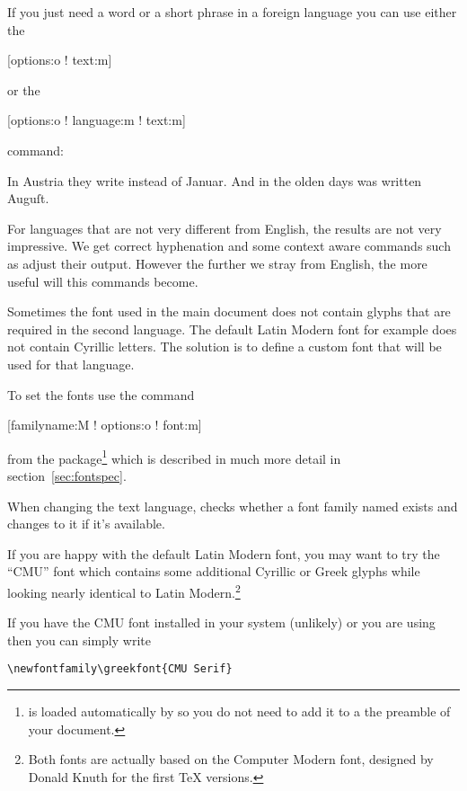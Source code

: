 If you just need a word or a short phrase in a foreign language you can use
either the
\begin{lscommand}
  [options:o ! text:m]
\end{lscommand}
or the
\begin{lscommand}
  [options:o ! language:m ! text:m]
\end{lscommand}
command:
\begin{example}[examplewidth=0.33\linewidth]
In Austria they write
instead of \textgerman{Januar}.
And in the olden days 
was written
\textgerman[script=blackletter]{Auguſt}.
\end{example}

For languages that are not very different from English, the results are not
very impressive. We get correct hyphenation and some context aware commands
such as  adjust their output. However the further we stray from
English, the more useful will this commands become.

Sometimes the font used in the main document does not contain glyphs that are
required in the second language. The default Latin Modern font for example does not
contain Cyrillic letters. The solution is to define a custom font that will be used
for that language. 

To set the fonts use the command
\begin{lscommand}
  [familyname:M ! options:o ! font:m]
\end{lscommand}
from the  package\footnote{ is loaded automatically
by  so you do not need to add it to a the preamble of your
document.} which is described in much more detail in
section~\ref{sec:fontspec}.

When changing the text language,  checks whether a font family named
 exists and changes to it if it's available.

If you are happy with the default Latin Modern font, you may want to try the \enquote{CMU} font
which contains some additional Cyrillic or Greek glyphs
while looking nearly identical to Latin Modern.\footnote{Both fonts are
actually based on the Computer Modern font, designed by Donald Knuth for
the first \TeX{} versions.}

If you have the CMU font installed in your system (unlikely) or you are using 
 then you can simply write
\begin{verbatim}
\newfontfamily\greekfont{CMU Serif}
\end{verbatim}

